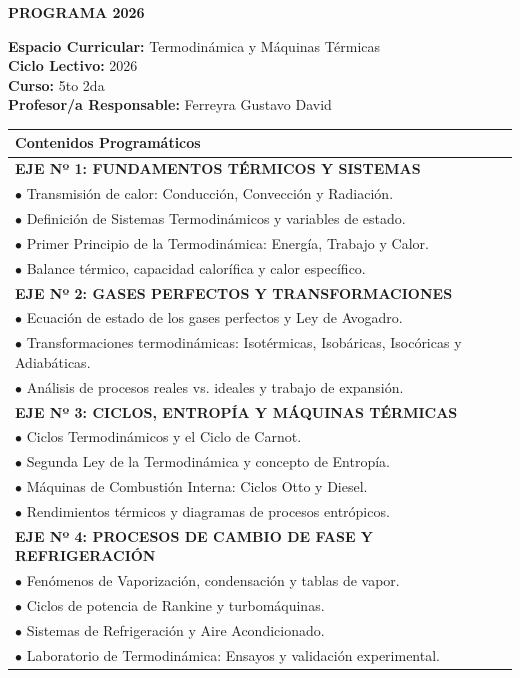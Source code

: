 \documentclass[11pt, a4paper]{article}
\begin{document}
\noindent\colorbox{schoolgreen}{\begin{minipage}{\dimexpr\textwidth-2\fboxsep}\centering \textbf{\fontsize{14}{16}\selectfont PROGRAMA 2026}\end{minipage}}

\vspace{1em}

\begin{flushleft}
\textbf{Espacio Curricular:} Termodinámica y Máquinas Térmicas \\
\textbf{Ciclo Lectivo:} 2026 \\
\textbf{Curso:} 5to 2da \\
\textbf{Profesor/a Responsable:} Ferreyra Gustavo David
\end{flushleft}

\vspace{1em}

\begin{longtable}{|p{\dimexpr\textwidth-2\tabcolsep-2\arrayrulewidth}|}
\hline
\rowcolor{gray!20} \textbf{Contenidos Programáticos} \\
\hline
\textbf{EJE Nº 1: FUNDAMENTOS TÉRMICOS Y SISTEMAS} \\
$\bullet$ Transmisión de calor: Conducción, Convección y Radiación. \\
$\bullet$ Definición de Sistemas Termodinámicos y variables de estado. \\
$\bullet$ Primer Principio de la Termodinámica: Energía, Trabajo y Calor. \\
$\bullet$ Balance térmico, capacidad calorífica y calor específico. \\
\hline
\textbf{EJE Nº 2: GASES PERFECTOS Y TRANSFORMACIONES} \\
$\bullet$ Ecuación de estado de los gases perfectos y Ley de Avogadro. \\
$\bullet$ Transformaciones termodinámicas: Isotérmicas, Isobáricas, Isocóricas y Adiabáticas. \\
$\bullet$ Análisis de procesos reales vs. ideales y trabajo de expansión. \\
\hline
\textbf{EJE Nº 3: CICLOS, ENTROPÍA Y MÁQUINAS TÉRMICAS} \\
$\bullet$ Ciclos Termodinámicos y el Ciclo de Carnot. \\
$\bullet$ Segunda Ley de la Termodinámica y concepto de Entropía. \\
$\bullet$ Máquinas de Combustión Interna: Ciclos Otto y Diesel. \\
$\bullet$ Rendimientos térmicos y diagramas de procesos entrópicos. \\
\hline
\textbf{EJE Nº 4: PROCESOS DE CAMBIO DE FASE Y REFRIGERACIÓN} \\
$\bullet$ Fenómenos de Vaporización, condensación y tablas de vapor. \\
$\bullet$ Ciclos de potencia de Rankine y turbomáquinas. \\
$\bullet$ Sistemas de Refrigeración y Aire Acondicionado. \\
$\bullet$ Laboratorio de Termodinámica: Ensayos y validación experimental. \\
\hline
\end{longtable}
\end{document}
